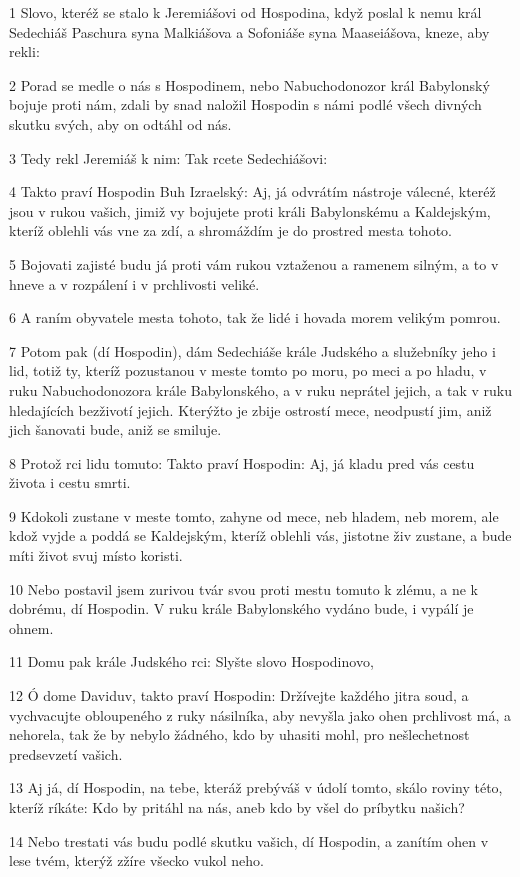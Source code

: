 \par 1 Slovo, kteréž se stalo k Jeremiášovi od Hospodina, když poslal k nemu král Sedechiáš Paschura syna Malkiášova a Sofoniáše syna Maaseiášova, kneze, aby rekli:
\par 2 Porad se medle o nás s Hospodinem, nebo Nabuchodonozor král Babylonský bojuje proti nám, zdali by snad naložil Hospodin s námi podlé všech divných skutku svých, aby on odtáhl od nás.
\par 3 Tedy rekl Jeremiáš k nim: Tak rcete Sedechiášovi:
\par 4 Takto praví Hospodin Buh Izraelský: Aj, já odvrátím nástroje válecné, kteréž jsou v rukou vašich, jimiž vy bojujete proti králi Babylonskému a Kaldejským, kteríž oblehli vás vne za zdí, a shromáždím je do prostred mesta tohoto.
\par 5 Bojovati zajisté budu já proti vám rukou vztaženou a ramenem silným, a to v hneve a v rozpálení i v prchlivosti veliké.
\par 6 A raním obyvatele mesta tohoto, tak že lidé i hovada morem velikým pomrou.
\par 7 Potom pak (dí Hospodin), dám Sedechiáše krále Judského a služebníky jeho i lid, totiž ty, kteríž pozustanou v meste tomto po moru, po meci a po hladu, v ruku Nabuchodonozora krále Babylonského, a v ruku neprátel jejich, a tak v ruku hledajících bezživotí jejich. Kterýžto je zbije ostrostí mece, neodpustí jim, aniž jich šanovati bude, aniž se smiluje.
\par 8 Protož rci lidu tomuto: Takto praví Hospodin: Aj, já kladu pred vás cestu života i cestu smrti.
\par 9 Kdokoli zustane v meste tomto, zahyne od mece, neb hladem, neb morem, ale kdož vyjde a poddá se Kaldejským, kteríž oblehli vás, jistotne živ zustane, a bude míti život svuj místo koristi.
\par 10 Nebo postavil jsem zurivou tvár svou proti mestu tomuto k zlému, a ne k dobrému, dí Hospodin. V ruku krále Babylonského vydáno bude, i vypálí je ohnem.
\par 11 Domu pak krále Judského rci: Slyšte slovo Hospodinovo,
\par 12 Ó dome Daviduv, takto praví Hospodin: Držívejte každého jitra soud, a vychvacujte obloupeného z ruky násilníka, aby nevyšla jako ohen prchlivost má, a nehorela, tak že by nebylo žádného, kdo by uhasiti mohl, pro nešlechetnost predsevzetí vašich.
\par 13 Aj já, dí Hospodin, na tebe, kteráž prebýváš v údolí tomto, skálo roviny této, kteríž ríkáte: Kdo by pritáhl na nás, aneb kdo by všel do príbytku našich?
\par 14 Nebo trestati vás budu podlé skutku vašich, dí Hospodin, a zanítím ohen v lese tvém, kterýž zžíre všecko vukol neho.

